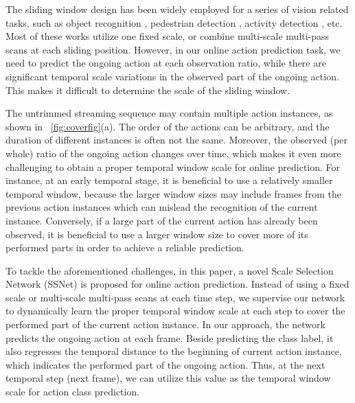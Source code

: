 \documentclass[10pt,twocolumn,letterpaper]{article}
\begin{document}
The sliding window design has been widely employed for a series of vision related tasks,
such as object recognition \cite{mutch2006multiclass},
pedestrian detection \cite{enzweiler2009monocular},
activity detection \cite{oneata2014lear,siva2011weakly,zanfir2013moving,hoai2014max}, etc.
Most of these works utilize one fixed scale, or combine multi-scale multi-pass scans at each sliding position.
However, in our online action prediction task, we need to predict the ongoing action at each observation ratio,
while there are significant temporal scale variations in the observed part of the ongoing action. This makes it difficult to determine the scale of the sliding window.

The untrimmed streaming sequence may contain multiple action instances, as shown in \figurename{~\ref{fig:coverfig}}(a).
The order of the actions can be arbitrary,
and the duration of different instances is often not the same.
Moreover, the observed (per whole) ratio of the ongoing action changes over time,
which makes it even more challenging to obtain a proper temporal window scale for online prediction.
For instance, at an early temporal stage,
it is beneficial to use a relatively smaller temporal window,
because the larger window sizes may include frames from the previous action instances which can mislead the recognition of the current instance.
Conversely, if a large part of the current action has already been observed,
it is beneficial to use a larger window size to cover more of its performed parts in order to achieve a reliable prediction.

To tackle the aforementioned challenges, in this paper, a novel Scale Selection Network (SSNet) is proposed for online action prediction.
Instead of using a fixed scale or multi-scale multi-pass scans at each time step,
we supervise our network to dynamically learn the proper temporal window scale at each step to cover the performed part of the current action instance.
In our approach,
the network predicts the ongoing action at each frame.
Beside predicting the class label,
it also regresses the temporal distance to the beginning of current action instance,
which indicates the performed part of the ongoing action.
Thus, at the next temporal step (next frame), we can utilize this value as the temporal window scale for action class prediction.
\end{document}

